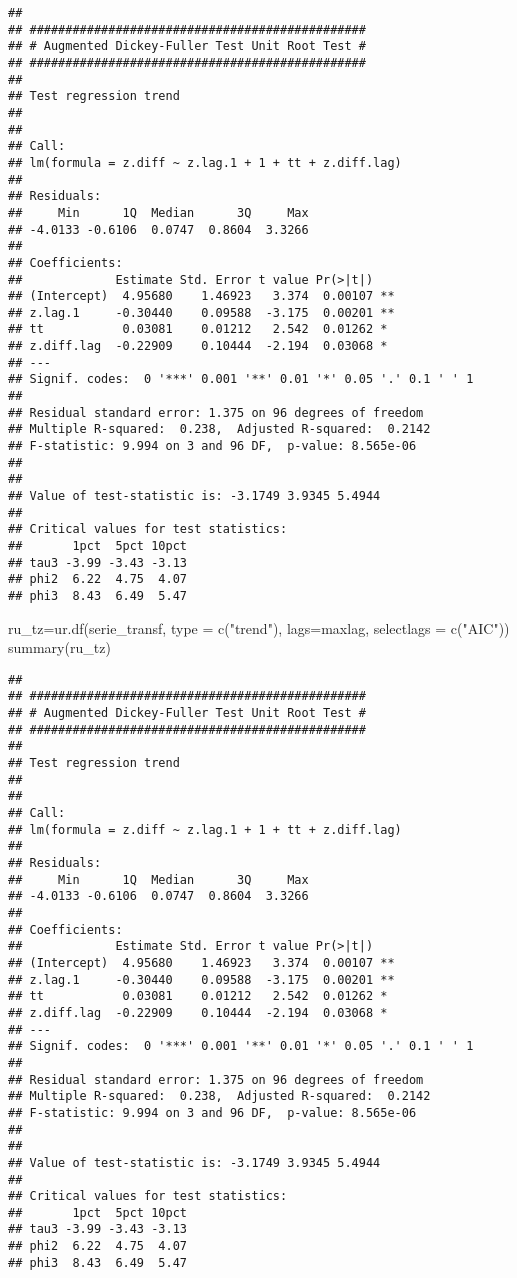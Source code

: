 \documentclass[
]{article}
\newenvironment{Shaded}{\begin{snugshade}}{\end{snugshade}}
\newcommand{\AttributeTok}[1]{\textcolor[rgb]{0.77,0.63,0.00}{#1}}
\newcommand{\FunctionTok}[1]{\textcolor[rgb]{0.00,0.00,0.00}{#1}}
\newcommand{\NormalTok}[1]{#1}
\newcommand{\OtherTok}[1]{\textcolor[rgb]{0.56,0.35,0.01}{#1}}
\newcommand{\StringTok}[1]{\textcolor[rgb]{0.31,0.60,0.02}{#1}}
\begin{document}
\begin{verbatim}
## 
## ############################################### 
## # Augmented Dickey-Fuller Test Unit Root Test # 
## ############################################### 
## 
## Test regression trend 
## 
## 
## Call:
## lm(formula = z.diff ~ z.lag.1 + 1 + tt + z.diff.lag)
## 
## Residuals:
##     Min      1Q  Median      3Q     Max 
## -4.0133 -0.6106  0.0747  0.8604  3.3266 
## 
## Coefficients:
##             Estimate Std. Error t value Pr(>|t|)   
## (Intercept)  4.95680    1.46923   3.374  0.00107 **
## z.lag.1     -0.30440    0.09588  -3.175  0.00201 **
## tt           0.03081    0.01212   2.542  0.01262 * 
## z.diff.lag  -0.22909    0.10444  -2.194  0.03068 * 
## ---
## Signif. codes:  0 '***' 0.001 '**' 0.01 '*' 0.05 '.' 0.1 ' ' 1
## 
## Residual standard error: 1.375 on 96 degrees of freedom
## Multiple R-squared:  0.238,  Adjusted R-squared:  0.2142 
## F-statistic: 9.994 on 3 and 96 DF,  p-value: 8.565e-06
## 
## 
## Value of test-statistic is: -3.1749 3.9345 5.4944 
## 
## Critical values for test statistics: 
##       1pct  5pct 10pct
## tau3 -3.99 -3.43 -3.13
## phi2  6.22  4.75  4.07
## phi3  8.43  6.49  5.47
\end{verbatim}

\begin{Shaded}
\begin{Highlighting}[]
\NormalTok{ru\_tz}\OtherTok{=}\FunctionTok{ur.df}\NormalTok{(serie\_transf, }\AttributeTok{type =} \FunctionTok{c}\NormalTok{(}\StringTok{"trend"}\NormalTok{), }\AttributeTok{lags=}\NormalTok{maxlag, }\AttributeTok{selectlags =} \FunctionTok{c}\NormalTok{(}\StringTok{"AIC"}\NormalTok{))}
\FunctionTok{summary}\NormalTok{(ru\_tz)}
\end{Highlighting}
\end{Shaded}

\begin{verbatim}
## 
## ############################################### 
## # Augmented Dickey-Fuller Test Unit Root Test # 
## ############################################### 
## 
## Test regression trend 
## 
## 
## Call:
## lm(formula = z.diff ~ z.lag.1 + 1 + tt + z.diff.lag)
## 
## Residuals:
##     Min      1Q  Median      3Q     Max 
## -4.0133 -0.6106  0.0747  0.8604  3.3266 
## 
## Coefficients:
##             Estimate Std. Error t value Pr(>|t|)   
## (Intercept)  4.95680    1.46923   3.374  0.00107 **
## z.lag.1     -0.30440    0.09588  -3.175  0.00201 **
## tt           0.03081    0.01212   2.542  0.01262 * 
## z.diff.lag  -0.22909    0.10444  -2.194  0.03068 * 
## ---
## Signif. codes:  0 '***' 0.001 '**' 0.01 '*' 0.05 '.' 0.1 ' ' 1
## 
## Residual standard error: 1.375 on 96 degrees of freedom
## Multiple R-squared:  0.238,  Adjusted R-squared:  0.2142 
## F-statistic: 9.994 on 3 and 96 DF,  p-value: 8.565e-06
## 
## 
## Value of test-statistic is: -3.1749 3.9345 5.4944 
## 
## Critical values for test statistics: 
##       1pct  5pct 10pct
## tau3 -3.99 -3.43 -3.13
## phi2  6.22  4.75  4.07
## phi3  8.43  6.49  5.47
\end{verbatim}
\end{document}
